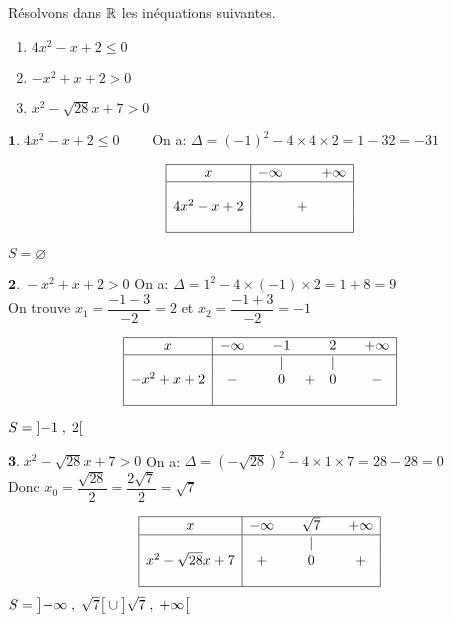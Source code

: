\begin{example}
Résolvons  dans $ \mathbb{R} $  les inéquations suivantes.


\begin{enumerate}
\item  $ 4x^{2}-x+2 \leq 0 $
\item  $ -x^{2}+x+2 >0 $
\item  $ x^{2}-\sqrt{28}x+7 > 0 $
  \end{enumerate}

 \end{example}
 
  $ \textbf{1.} \; 4x^{2}-x+2 \leq 0\qquad $ On a:\; $ \Delta=(-1)^{2}-4\times4\times2=1-32=-31 $ 

$$\begin{array}{|c|ccc|}
\hline
x & -\infty & & +\infty \\
\hline
& & & \\
4x^2 - x + 2 & & + & \\
& & & \\
\hline
\end{array}$$

$ S=\varnothing $

\vspace*{0.5cm}
$ \textbf{2.}\; -x^{2}+x+2 >0$ \qquad On a:\; $ \Delta=1^{2}-4\times(-1)\times2=1+8=9 $\\ 
On trouve $x_1= \dfrac{-1-3}{-2}=2$ \;et\; $x_2=\dfrac{-1+3}{-2}=-1 $

$$\begin{array}{|c|ccccccc|}
\hline
x & -\infty & & -1 & & 2 & & +\infty \\
\hline
& & & \mid & & \mid & & \\
-x^2 + x + 2 & - & & 0 & + & 0 & & - \\
& & & & & & & \\
\hline
\end{array}$$

$ S=\left]-1 \;,\; 2\right[ $


\vspace*{0.5cm}
$ \textbf{3.}\;  x^{2}-\sqrt{28}x+7 > 0$ \qquad On a:\; $ \Delta=(-\sqrt{28})^{2}-4\times 1\times7=28-28=0 $\\
Donc \; $ x_{0}=\dfrac{\sqrt{28}}{2} =\dfrac{2\sqrt{7}}{2}=\sqrt{7}$

$$\begin{array}{|c|ccccc|}
\hline
x & -\infty & & \sqrt{7} & & +\infty \\
\hline
& & & \mid & & \\
x^2 - \sqrt{28}x + 7 & + & & 0 & & + \\
& & & & & \\
\hline
\end{array}$$
\vspace*{0.3cm}
$ S=\left]-\infty \;,\; \sqrt{7}\right[\cup \left]\sqrt{7} \;,\; +\infty\right[$

